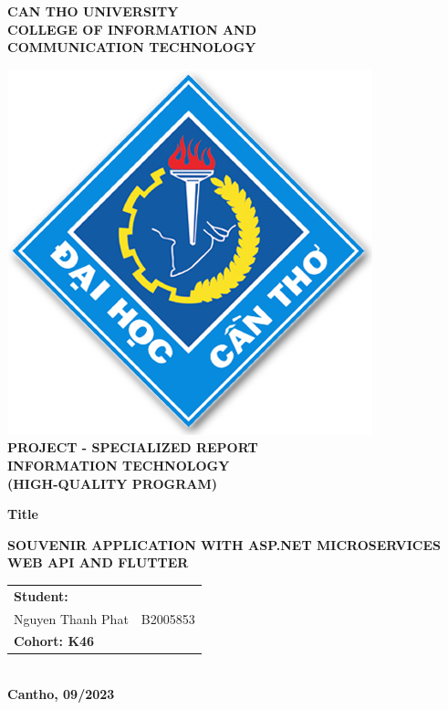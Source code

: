 
\begin{titlepage}

    \begin{center}

        \textbf{CAN THO UNIVERSITY\\}
        \textbf{COLLEGE OF INFORMATION AND\\ COMMUNICATION TECHNOLOGY\\[1cm]}

        \includegraphics{../images/logo.png}\\[1cm]

        \textbf{PROJECT - SPECIALIZED REPORT \\}
        \textbf{  INFORMATION TECHNOLOGY \\}
        \textbf{(HIGH-QUALITY PROGRAM)\\[1.5cm]}

        \begin{large}
            \textbf{Title\\[0.5cm]}
        \end{large}
        \textbf{{\Large SOUVENIR APPLICATION WITH ASP.NET \newline MICROSERVICES WEB API AND FLUTTER}}
        \\[3.5cm]

        \begin{tabular}{ l l }
            \multicolumn{2}{l}{\textbf{Student:}}    \\
            Nguyen Thanh Phat & B2005853             \\
            \multicolumn{2}{l}{\textbf{Cohort: K46}} \\
        \end{tabular}
        \\[4cm]

        \textbf{Cantho, 09/2023}

    \end{center}

\end{titlepage}
